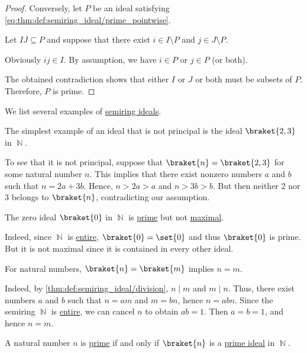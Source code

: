 \begin{proof}
  \NecessitySubProof* Conversely, let \( P \) be an ideal satisfying \eqref{eq:thm:def:semiring_ideal/prime_pointwise}.

  Let \( IJ \subseteq P \) and suppose that there exist \( i \in I \setminus P \) and \( j \in J \setminus P \).

  Obviously \( ij \in I \). By assumption, we have \( i \in P \) or \( j \in P \) (or both).

  The obtained contradiction shows that either \( I \) or \( J \) or both must be subsets of \( P \). Therefore, \( P \) is prime.
\end{proof}

\begin{example}\label{ex:def:semiring_ideal}
  We list several examples of \hyperref[def:semiring_ideal]{semiring ideals}.
  \begin{thmenum}
     The simplest example of an ideal that is not principal is the ideal \( \braket{ 2, 3 } \) in \( \BbbN \).

    To see that it is not principal, suppose that \( \braket{ n } = \braket{ 2, 3 } \) for some natural number \( n \). This implies that there exist nonzero numbers \( a \) and \( b \) such that \( n = 2a + 3b \). Hence, \( n > 2a > a \) and \( n > 3b > b \). But then neither \( 2 \) nor \( 3 \) belongs to \( \braket{ n } \), contradicting our assumption.

     The zero ideal \( \braket{ 0 } \) in \( \BbbN \) is \hyperref[def:semiring_ideal/prime]{prime} but not \hyperref[def:semiring_ideal/maximal]{maximal}.

    Indeed, since \( \BbbN \) is \hyperref[def:entire_semiring]{entire}, \( \braket{ 0 } = \set{ 0 } \) and thus \( \braket{ 0 } \) is prime. But it is not maximal since it is contained in every other ideal.

     For natural numbers, \( \braket{ n } = \braket{ m } \) implies \( n = m \).

    Indeed, by \cref{thm:def:semiring_ideal/division}, \( n \mid m \) and \( m \mid n \). Thus, there exist numbers \( a \) and \( b \) such that \( n = am \) and \( m = bn \), hence \( n = abn \). Since the semiring \( \BbbN \) is \hyperref[def:entire_semiring]{entire}, we can cancel \( n \) to obtain \( ab = 1 \). Then \( a = b = 1 \), and hence \( n = m \).

     A natural number \( n \) is \hyperref[def:prime_number]{prime} if and only if \( \braket{n} \) is a \hyperref[def:semiring_ideal/prime]{prime ideal} in \( \BbbN \).


\end{thmenum}
\end{example}
